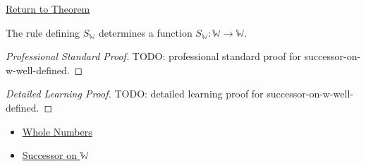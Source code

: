 \newpage
{}
\label{prf:successor-on-w-well-defined}

\begin{remark*}[Return]
\hyperref[thm:successor-on-w-well-defined]{Return to Theorem}
\end{remark*}

\begin{theorem*}
The rule defining $S_{\mathbb{W}}$ determines a function
$S_{\mathbb{W}}:\mathbb{W}\to\mathbb{W}$.
\end{theorem*}

\begin{proof}[Professional Standard Proof]
\LRAProofBodyStart
TODO: professional standard proof for successor-on-w-well-defined.
\end{proof}

\begin{proof}[Detailed Learning Proof]
\LRAProofBodyStart
TODO: detailed learning proof for successor-on-w-well-defined.
\end{proof}

\begin{remark*}
\end{remark*}

\begin{dependencies}
\begin{itemize}
  \item \hyperref[def:whole-numbers]{Whole Numbers}
  \item \hyperref[def:successor-on-w]{Successor on $\mathbb{W}$}
\end{itemize}
\end{dependencies}

\clearpage
